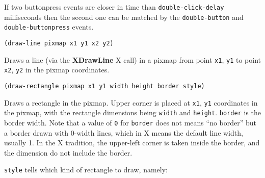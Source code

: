 

If two buttonpress events are closer in time than \verb"double-click-delay"
milliseconds then the second one can be matched by the \verb"double-button"
and \verb"double-buttonpress" events.

        
{\usagefont\begin{verbatim}
(draw-line pixmap x1 y1 x2 y2)
\end{verbatim}}\usageupspace

Draws a line (via the {\bf XDrawLine} X call) in a pixmap from point
\verb"x1", \verb"y1" to point \verb"x2", \verb"y2" in the pixmap
coordinates. 


        
{\usagefont\begin{verbatim}
(draw-rectangle pixmap x1 y1 width height border style)
\end{verbatim}}\usageupspace

Draws a rectangle in the pixmap. Upper corner is placed at \verb|x1|,
\verb|y1| coordinates in the pixmap, with the rectangle dimensions being
\verb|width| and \verb|height|. \verb|border| is the border width. Note that a
value of \verb|0| for \verb|border| does not means ``no border'' but a border
drawn with 0-width lines, which in X means the default line width, usually 1.
In the X tradition, the upper-left corner is taken inside the border, and the
dimension do not include the border.

\verb|style| tells which kind of rectangle to draw, namely:


        
